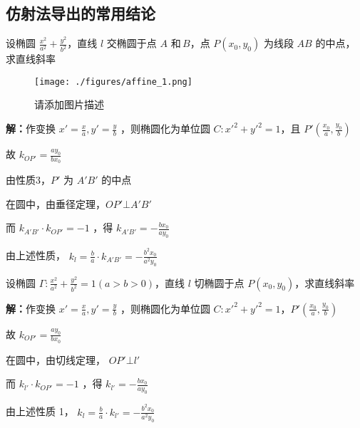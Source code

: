 \subsection{仿射法导出的常用结论}
\begin{corollary}{}
设椭圆 $\displaystyle{\frac{x^2}{a^2}+\frac{y^2}{b^2}}$，直线 $\displaystyle{l}$ 交椭圆于点 $\displaystyle{A}$ 和\,$\displaystyle{B}$，点 $\displaystyle{P(x_0,y_0)}$ 为线段 $\displaystyle{AB}$ 的中点，求直线斜率
\begin{figure}[ht]
\centering
\texttt{[image: ./figures/affine\_1.png]}
\caption{请添加图片描述} \label{affine_fig1}
\end{figure}

\textbf{解：}作变换 $\displaystyle{x'=\frac{x}{a},y'=\frac{y}{b}}$ ，则椭圆化为单位圆 $\displaystyle{C:x'^2+y'^2=1}$，且 $\displaystyle{P'\left(\frac{x_0}{a},\frac{y_0}{b}\right)}$

故 $\displaystyle{k_{OP'}=\frac{ay_0}{bx_0}}$

由性质3，$\displaystyle{P'}$ 为 $\displaystyle{A'B'}$ 的中点

在圆中，由垂径定理，$\displaystyle{OP'\bot A'B'}$

而 $\displaystyle{k_{A'B'}\cdot k_{OP'}=-1}$ ，得 $\displaystyle{k_{A'B'}=-\frac{bx_0}{ay_0}}$

由上述性质， $\displaystyle{k_l=\frac{b}{a}\cdot k_{A'B'}=-\frac{b^2x_0}{a^2y_0}}$
\end{corollary}
\begin{corollary}{}
设椭圆   $\displaystyle{\Gamma:\frac{x^2}{a^2}+\frac{y^2}{b^2}=1(a>b>0)}$，直线 $\displaystyle{l}$ 切椭圆于点 $\displaystyle{P(x_0,y_0)}$，求直线斜率 

\textbf{解：}作变换 $\displaystyle{x'=\frac{x}{a},y'=\frac{y}{b}}$ ，则椭圆化为单位圆 $\displaystyle{C:x'^2+y'^2=1}$，$\displaystyle{P'\left(\frac{x_0}{a},\frac{y_0}{b}\right)}$ 

故  $\displaystyle{k_{OP'}=\frac{ay_0}{bx_0}}$ 

在圆中，由切线定理， $\displaystyle{OP'\bot l'}$ 

而  $\displaystyle{k_{l'}\cdot k_{OP'}=-1}$ ，得 $\displaystyle{k_{l'}=-\frac{bx_0}{ay_0}}$ 

由上述性质 1， $\displaystyle{k_l=\frac{b}{a}\cdot k_{l'}=-\frac{b^2x_0}{a^2y_0}}$ 

\end{corollary}

